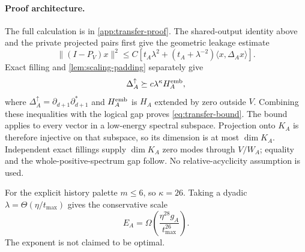 \paragraph{Proof architecture.}
The full calculation is in \cref{app:transfer-proof}.  The shared-output
identity above and the private projected pairs first give the geometric
leakage estimate
\begin{equation}
\label{eq:geometric-leakage}
\|(I-P_V)x\|^2
\le C\left[t_A\lambda^2+
(t_A+\lambda^{-2})\langle x,\Delta_Ax\rangle\right].
\end{equation}
Exact filling and \cref{lem:scaling-padding} separately give
\begin{equation}
\label{eq:logical-domination}
\Delta_A^\uparrow\succeq c\lambda^\kappa H_A^{\rm emb},
\end{equation}
where \(\Delta_A^\uparrow=\partial_{d+1}\partial_{d+1}^*\) and
\(H_A^{\rm emb}\) is \(H_A\) extended by zero outside \(V\).
Combining these inequalities with the logical gap proves
\cref{eq:transfer-bound}.  The bound applies to every vector in a low-energy
spectral subspace.  Projection onto \(K_A\) is therefore injective on that
subspace, so its dimension is at most \(\dim K_A\).  Independent exact
fillings supply \(\dim K_A\) zero modes through \(V/W_A\); equality and the
whole-positive-spectrum gap follow.  No relative-acyclicity assumption is
used.

For the explicit history palette \(m\le6\), so \(\kappa=26\).  Taking a
dyadic \(\lambda=\Theta(\eta/t_{\max})\) gives the conservative scale
\begin{equation}
\label{eq:weighted-gap}
E_A=\Omega\!\left(\frac{\eta^{28}g_A}{t_{\max}^{26}}\right).
\end{equation}
The exponent is not claimed to be optimal.
